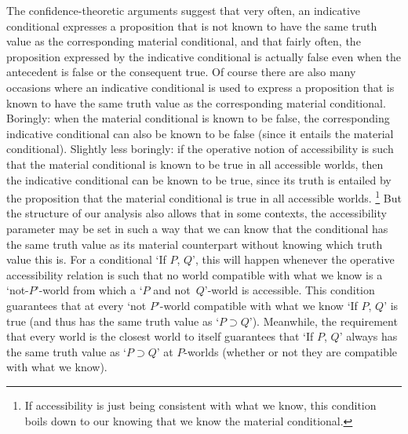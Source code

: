 \documentclass[If.tex]{subfiles}
\begin{document}
The confidence-theoretic arguments suggest that very often, an indicative conditional expresses a proposition that is not known to have the same truth value as the corresponding material conditional, and that fairly often, the proposition expressed by the indicative conditional is actually false even when the antecedent is false or the consequent true.  Of course there are also many occasions where an indicative conditional is used to express a proposition that is known to have the same truth value as the corresponding material conditional.  Boringly: when the material conditional is known to be false, the corresponding indicative conditional can also be known to be false (since it entails the material conditional).  Slightly less boringly: if the operative notion of accessibility is such that the material conditional is known to be true in all accessible worlds, then the indicative conditional can be known to be true, since its truth is entailed by the proposition that the material conditional is true in all accessible worlds.%
\footnote{If accessibility is just being consistent with what we know, this condition boils down to our knowing that we know the material conditional.}
But the structure of our analysis also allows that in some contexts, the accessibility parameter may be set in such a way that we can know that the conditional has the same truth value as its material counterpart without knowing which truth value this is.  For a conditional ‘If $P$, $Q$’, this will happen whenever the operative accessibility relation is such that no world compatible with what we know is a ‘not-$P$’-world from which a ‘$P$ and not~$Q$’-world is accessible.  This condition guarantees that at every ‘not $P$’-world compatible with what we know ‘If $P$, $Q$’ is true (and thus has the same truth value as ‘$P⊃Q$’).  Meanwhile, the requirement that every world is the closest world to itself guarantees that ‘If $P$, $Q$’ always has the same truth value as ‘$P⊃Q$’ at $P$-worlds (whether or not they are compatible with what we know).  
\end{document}

